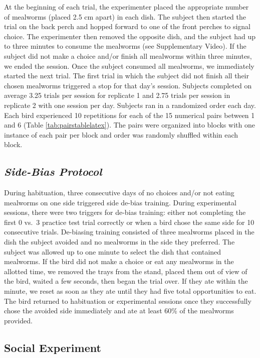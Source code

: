 \documentclass[
  ,pub,floatsintext]{apa6}
\begin{document}
At the beginning of each trial, the experimenter placed the appropriate number of mealworms (placed 2.5 cm apart) in each dish. The subject then started the trial on the back perch and hopped forward to one of the front perches to signal choice. The experimenter then removed the opposite dish, and the subject had up to three minutes to consume the mealworms (see Supplementary Video). If the subject did not make a choice and/or finish all mealworms within three minutes, we ended the session. Once the subject consumed all mealworms, we immediately started the next trial. The first trial in which the subject did not finish all their chosen mealworms triggered a stop for that day's session. Subjects completed on average 3.25 trials per session for replicate 1 and 2.75 trials per session in replicate 2 with one session per day. Subjects ran in a randomized order each day. Each bird experienced 10 repetitions for each of the 15 numerical pairs between 1 and 6 (Table \ref{tab:pairstablelatex}). The pairs were organized into blocks with one instance of each pair per block and order was randomly shuffled within each block.

\hypertarget{side-bias-protocol}{%
\subsection{\texorpdfstring{\emph{Side-Bias Protocol}}{Side-Bias Protocol}}\label{side-bias-protocol}}

During habituation, three consecutive days of no choices and/or not eating mealworms on one side triggered side de-bias training. During experimental sessions, there were two triggers for de-bias training: either not completing the first 0 vs.~3 practice test trial correctly or when a bird chose the same side for 10 consecutive trials. De-biasing training consisted of three mealworms placed in the dish the subject avoided and no mealworms in the side they preferred. The subject was allowed up to one minute to select the dish that contained mealworms. If the bird did not make a choice or eat any mealworms in the allotted time, we removed the trays from the stand, placed them out of view of the bird, waited a few seconds, then began the trial over. If they ate within the minute, we reset as soon as they ate until they had five total opportunities to eat. The bird returned to habituation or experimental sessions once they successfully chose the avoided side immediately and ate at least 60\% of the mealworms provided.

\hypertarget{social-experiment}{%
\subsection{Social Experiment}\label{social-experiment}}
\end{document}

